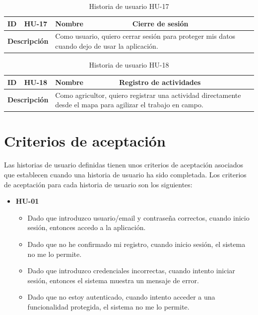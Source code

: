 \begin{table}[H]
    \centering
    \begin{tabular}{|p{2cm}|p{4cm}|p{2cm}|p{4cm}|}
        \hline
        \textbf{ID} & HU-17 & \textbf{Nombre} & Cierre de sesión \\
        \hline
        \multicolumn{2}{|p{6cm}|}{\textbf{Descripción}} & \multicolumn{2}{p{6cm}|}{Como usuario, quiero cerrar sesión para proteger mis datos cuando dejo de usar la aplicación.} \\
        \hline
    \end{tabular}
    \caption{Historia de usuario HU-17}
    \label{tab:hu_17}
\end{table}

\begin{table}[H]
    \centering
    \begin{tabular}{|p{2cm}|p{4cm}|p{2cm}|p{4cm}|}
        \hline
        \textbf{ID} & HU-18 & \textbf{Nombre} & Registro de actividades \\
        \hline
        \multicolumn{2}{|p{6cm}|}{\textbf{Descripción}} & \multicolumn{2}{p{6cm}|}{Como agricultor, quiero registrar una actividad directamente desde el mapa para agilizar el trabajo en campo.} \\
        \hline
    \end{tabular}
    \caption{Historia de usuario HU-18}
    \label{tab:hu_18}
\end{table}

\section{Criterios de aceptación}

Las historias de usuario definidas tienen unos criterios de aceptación asociados que establecen cuando una historia de usuario ha sido
completada. Los criterios de aceptación para cada historia de usuario son los siguientes:

\begin{itemize}
    \item \textbf{HU-01}
    \begin{itemize}
        \item Dado que introduzco usuario/email y contraseña correctos, cuando inicio sesión, entonces accedo a la aplicación.
        \item Dado que no he confirmado mi registro, cuando inicio sesión, el sistema no me lo permite.
        \item Dado que introduzco credenciales incorrectas, cuando intento iniciar sesión, entonces el sistema muestra un mensaje de error.
        \item Dado que no estoy autenticado, cuando intento acceder a una funcionalidad protegida, el sistema no me lo permite.
    \end{itemize}
\end{itemize}

